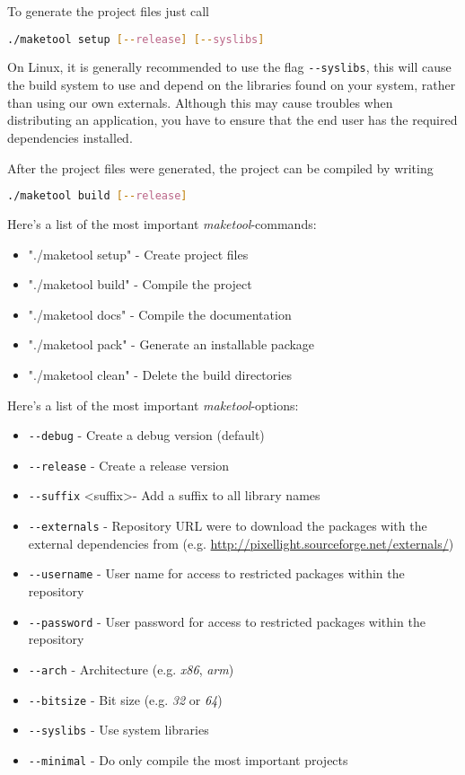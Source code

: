To generate the project files just call
\begin{lstlisting}[language=bash]
./maketool setup [--release] [--syslibs]
\end{lstlisting}

On Linux, it is generally recommended to use the flag \verb+--syslibs+, this will cause the build system to use and depend on the libraries found on your system, rather than using our own externals. Although this may cause troubles when distributing an application, you have to ensure that the end user has the required dependencies installed.

After the project files were generated, the project can be compiled by writing
\begin{lstlisting}[language=bash]
./maketool build [--release]
\end{lstlisting}

Here's a list of the most important \emph{maketool}-commands:
\begin{itemize}
\item{"./maketool setup"	- Create project files}
\item{"./maketool build"	- Compile the project}
\item{"./maketool docs"		- Compile the documentation}
\item{"./maketool pack"		- Generate an installable package}
\item{"./maketool clean"	- Delete the build directories}
\end{itemize}

Here's a list of the most important \emph{maketool}-options:
\begin{itemize}
\item{\verb+--debug+								- Create a debug version (default)}
\item{\verb+--release+								- Create a release version}
\item{\verb+--suffix+ \textless suffix\textgreater	- Add a suffix to all library names}
\item{\verb+--externals+							- Repository URL were to download the packages with the external dependencies from (e.g. \url{http://pixellight.sourceforge.net/externals/})}
\item{\verb+--username+								- User name for access to restricted packages within the repository}
\item{\verb+--password+								- User password for access to restricted packages within the repository}
\item{\verb+--arch+									- Architecture (e.g. \emph{x86}, \emph{arm})}
\item{\verb+--bitsize+								- Bit size (e.g. \emph{32} or \emph{64})}
\item{\verb+--syslibs+								- Use system libraries}
\item{\verb+--minimal+								- Do only compile the most important projects}
\end{itemize}

